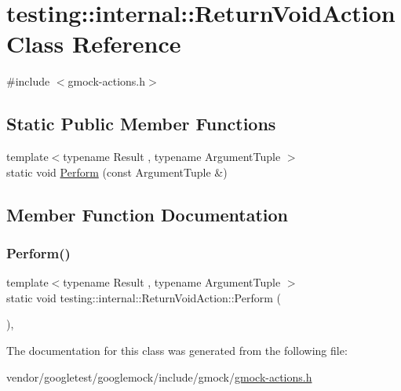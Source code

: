 \hypertarget{classtesting_1_1internal_1_1_return_void_action}{}\section{testing\+:\+:internal\+:\+:Return\+Void\+Action Class Reference}
\label{classtesting_1_1internal_1_1_return_void_action}


{\ttfamily \#include $<$gmock-\/actions.\+h$>$}

\subsection*{Static Public Member Functions}
\begin{DoxyCompactItemize}
\item 
{\footnotesize template$<$typename Result , typename Argument\+Tuple $>$ }\\static void \hyperlink{classtesting_1_1internal_1_1_return_void_action_ab9ea50ff501225b7510a623d0f0a405e}{Perform} (const Argument\+Tuple \&)
\end{DoxyCompactItemize}


\subsection{Member Function Documentation}
\mbox{\label{classtesting_1_1internal_1_1_return_void_action_ab9ea50ff501225b7510a623d0f0a405e}} 
\subsubsection{\texorpdfstring{Perform()}{Perform()}}
{\footnotesize\ttfamily template$<$typename Result , typename Argument\+Tuple $>$ \\
static void testing\+::internal\+::\+Return\+Void\+Action\+::\+Perform (\begin{DoxyParamCaption}\item[{const Argument\+Tuple \&}]{ }\end{DoxyParamCaption})\hspace{0.3cm}{\ttfamily [inline]}, {\ttfamily [static]}}



The documentation for this class was generated from the following file\+:\begin{DoxyCompactItemize}
\item 
vendor/googletest/googlemock/include/gmock/\hyperlink{gmock-actions_8h}{gmock-\/actions.\+h}\end{DoxyCompactItemize}
